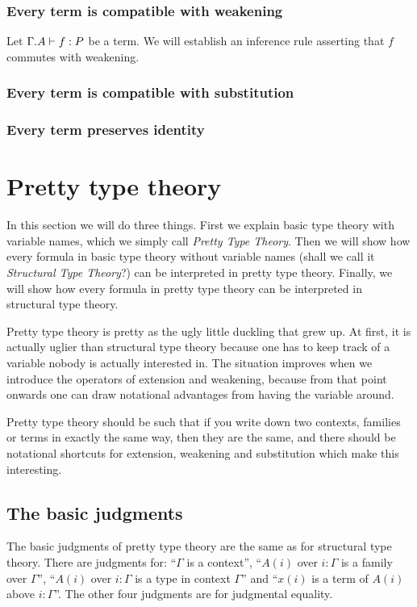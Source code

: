 \subsubsection{Every term is compatible with weakening}
Let $\jterm{{\Gamma}{A}}{P}{f}$ be a term. We will establish an inference rule
asserting that $f$ commutes with weakening. 

\subsubsection{Every term is compatible with substitution}

\subsubsection{Every term preserves identity}


\section{Pretty type theory}
In this section we will do three things. First we explain basic type theory with
variable names, which we simply call \emph{Pretty Type Theory}. 
Then we will show how every formula in basic type theory without
variable names (shall we call it \emph{Structural Type Theory}?) 
can be interpreted in pretty type theory. Finally, we will show how every formula
in pretty type theory can be interpreted in structural type theory.

Pretty type theory is pretty as the ugly little duckling that grew up. At first, it is actually uglier than
structural type theory because one has to keep track of a variable nobody is
actually interested in. The situation improves when we introduce the operators
of extension and weakening, because from that point onwards one can draw notational
advantages from having the variable around.

Pretty type theory should be such that if you write down two contexts, families
or terms in exactly the same way, then they are the same, and there should be
notational shortcuts for extension, weakening and substitution which make
this interesting.

\subsection{The basic judgments}
The basic judgments of pretty type theory are the same as for structural type
theory. There are judgments for: ``$\Gamma$ is a context'',
``$A(i)$ over $i:\Gamma$ is a family over $\Gamma$'', ``$A(i)$ over $i:\Gamma$ 
is a type in context $\Gamma$''
and ``$x(i)$ is a term of $A(i)$ above $i:\Gamma$''. The other four
judgments are for judgmental equality. 

